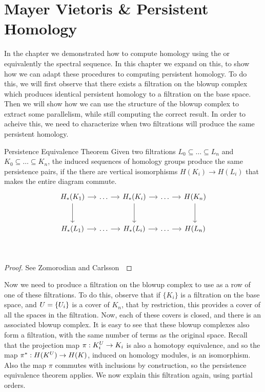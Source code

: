 \chapter{Mayer Vietoris \& Persistent Homology}
In the chapter we demonstrated how to compute homology using the \mvb{} or equivalently the \mv spectral sequence. In this chapter we expand on this, to show how we can adapt these procedures to computing persistent homology. To do this, we will first observe that there exists a filtration on the blowup complex which produces identical persistent homology to a filtration on the base space. Then we will show how we can use the structure of the blowup complex to extract some parallelism, while still computing the correct result. In order to acheive this, we need to characterize when two filtrations will produce the same persistent homology. 
\begin{theorem}{Persistence Equivalence Theorem}
    Given two filtrations $L_0 \subseteq \ldots \subseteq L_n$ and
    $K_0 \subseteq \ldots \subseteq K_n$, the induced sequences of homology
    groups produce the same persistence pairs,
    if the there are vertical isomorphisms $H(K_i) \to H(L_i)$ that makes the entire diagram commute.
\[
\begin{tikzcd}[row sep=large, column sep=small]
    H_*(K_1) \arrow{r}\arrow{d} & \ldots \arrow{r} & H_*(K_i)  \arrow{r}\arrow{d} & \ldots \arrow{r} & H(K_n) \arrow{d} \\
    H_*(L_1) \arrow{r} & \ldots \arrow{r} & H_*(L_i)  \arrow{r} & \ldots \arrow{r} & H(L_n) \\
\end{tikzcd}
\]
\end{theorem}
\begin{proof}
See Zomorodian and Carlsson~\cite{zc-cph-05}
\end{proof}
Now we need to produce a filtration on the blowup complex to use as a row of one of these filtrations. To do this, observe that if $\{K_i\}$ is a filtration on the base space, and $U =\{ U_i \}$ is a cover of $K_n$, that by restriction, this provides a cover of all the spaces in the filtration. Now, each of these covers is closed, and there is an associated blowup complex. It is easy to see that these blowup complexes also form a filtration, with the same number of terms as the original space. Recall that the projection map $\pi: K_i^U \to K_i$ is also a homotopy equivalence, and so the map $\pi^*: H(K^U) \to H(K)$, induced on homology modules, is an isomorphism. Also the map $\pi$ commutes with inclusions by construction, so  the persistence equivalence theorem applies. We now explain this filtration again, using partial orders.

